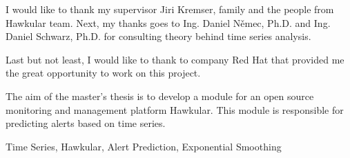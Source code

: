 \documentclass[12pt,oneside]{fithesis2}
\begin{document}
\FrontMatter                    %
\ThesisTitlePage                %
\begin{ThesisDeclaration}       %
  \DeclarationText
  \AdvisorName
\end{ThesisDeclaration}

\begin{ThesisThanks}            %
  I would like to thank my supervisor Jiri Kremser, family and 
  the people from Hawkular team. Next, my thanks goes to Ing. Daniel Němec, Ph.D. and
  Ing. Daniel Schwarz, Ph.D. for consulting theory behind time series analysis. 

  Last but not least, I would like to thank to company Red Hat that provided me 
  the great opportunity to work on this project.
\end{ThesisThanks}

\begin{ThesisAbstract}          %
  The aim of the master's thesis is to develop a module for an open source monitoring
  and management platform Hawkular. This module is responsible for predicting
  alerts based on time series. 
\end{ThesisAbstract}

\begin{ThesisKeyWords}          %
  Time Series, Hawkular, Alert Prediction, Exponential Smoothing
\end{ThesisKeyWords}

\tableofcontents                %

\MainMatter                     %

    


\appendix

\end{document}
